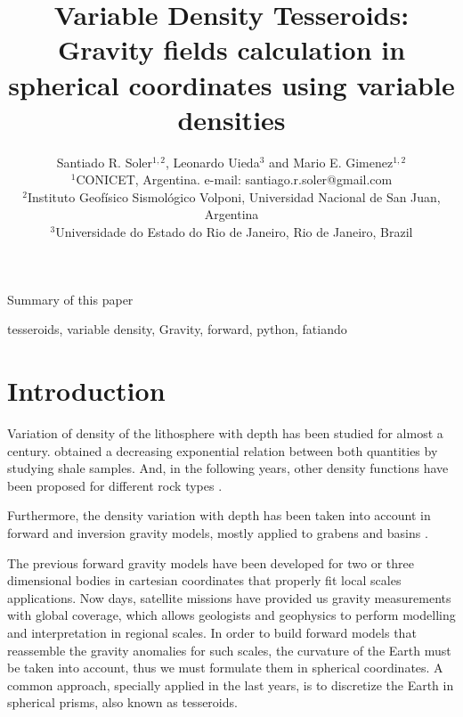 \documentclass[extra]{gji}
\begin{document}
\title[
    Variable Density Tesseroids]
    {Variable Density Tesseroids: Gravity fields calculation in spherical coordinates using variable densities
}
\author
    {Santiado R. Soler$^{1,2}$, Leonardo Uieda$^3$ and Mario E. Gimenez$^{1,2}$ \\
    $^1$CONICET, Argentina. e-mail: santiago.r.soler@gmail.com\\
    $^2$Instituto Geofísico Sismológico Volponi, Universidad Nacional de San Juan, Argentina\\
    $^3$Universidade do Estado do Rio de Janeiro, Rio de Janeiro, Brazil
    }


\maketitle

\begin{summary}
Summary of this paper 
\end{summary}

\begin{keywords}
tesseroids, variable density, Gravity, forward, python, fatiando
\end{keywords}



\section{Introduction}

Variation of density of the lithosphere with depth has been studied for almost a century. 
\citet{Athy1930} obtained a decreasing exponential relation between both quantities by studying shale samples. And, in the following years, other density functions have been proposed for different rock types \citep[e.g.][]{Maxant1980, Rao1986, Rao1993, Rao1994}.

Furthermore, the density variation with depth has been taken into account in forward and inversion gravity models, mostly applied to grabens and basins \citep{Cordell1973, Rao1986, Cowie1990, Rao1993, Rao1994, Welford2010}.

The previous forward gravity models have been developed for two or three dimensional bodies in cartesian coordinates that properly fit local scales applications.
Now days, satellite missions have provided us gravity measurements with global coverage, which allows geologists and geophysics to perform modelling and interpretation in regional scales.
In order to build forward models that reassemble the gravity anomalies for such scales, the curvature of the Earth must be taken into account, thus we must formulate them in spherical coordinates.
A common approach, specially applied in the last years, is to discretize the Earth in spherical prisms, also known as tesseroids. 
\end{document}
